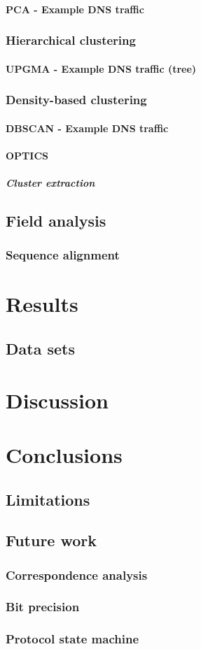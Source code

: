 \documentclass[a4paper]{report}
\begin{document}
\subsubsection{PCA - Example DNS traffic}
\subsection{Hierarchical clustering}
\subsubsection{UPGMA - Example DNS traffic (tree)}
\subsection{Density-based clustering}
\subsubsection{DBSCAN - Example DNS traffic}
\subsubsection{OPTICS}
\paragraph{Cluster extraction}
\section{Field analysis}
\subsection{Sequence alignment}
\chapter{Results}
\section{Data sets}
\chapter{Discussion}
\chapter{Conclusions}
\section{Limitations}
\section{Future work}
\subsection{Correspondence analysis}
\subsection{Bit precision}
\subsection{Protocol state machine}



\end{document}
